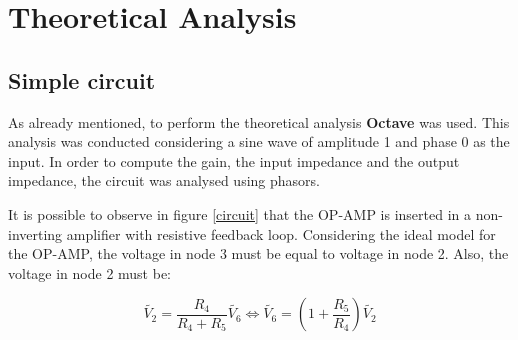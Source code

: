 \newpage
\section{Theoretical Analysis}
\label{sec:analysis}



\subsection{Simple circuit}

As already mentioned, to perform the theoretical analysis {\bf Octave} was used. This analysis was conducted considering a sine wave of amplitude 1 and phase 0 as the input. In order to compute the gain, the input impedance and the output impedance, the circuit was analysed using phasors.

It is possible to observe in figure \ref{circuit} that the OP-AMP is inserted in a non-inverting amplifier with resistive feedback loop. Considering the ideal model for the OP-AMP, the voltage in node 3 must be equal to voltage in node 2. Also, the voltage in node 2 must be:

\begin{equation}
        \widetilde{V_2} = \frac{R_4}{R_4+R_5}\widetilde{V_6} \iff \widetilde{V_6} = (1+\frac{R_5}{R_4})\widetilde{V_2}
\end{equation}

